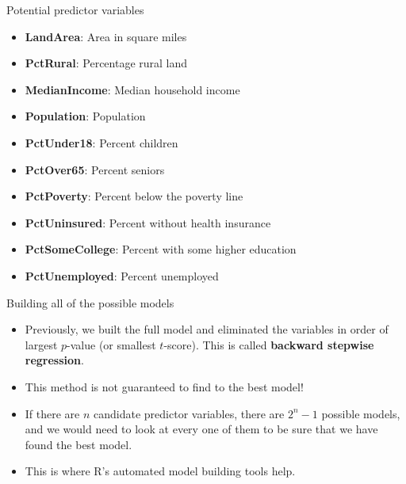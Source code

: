 \documentclass{beamer}\usepackage[]{graphicx}\usepackage[]{color}
\makeatletter
\newcommand{\hlnum}[1]{\textcolor[rgb]{0.824,0.412,0.118}{#1}}%
\newcommand{\hlcom}[1]{\textcolor[rgb]{0.824,0.706,0.549}{#1}}%
\newcommand{\hlopt}[1]{\textcolor[rgb]{1,0.894,0.769}{#1}}%
\newcommand{\hlstd}[1]{\textcolor[rgb]{1,0.894,0.769}{#1}}%
\newcommand{\hlkwd}[1]{\textcolor[rgb]{1,0.78,0.769}{#1}}%
\newenvironment{kframe}{%
 \def\at@end@of@kframe{}%
 \ifinner\ifhmode%
  \def\at@end@of@kframe{\end{minipage}}%
  \begin{minipage}{\columnwidth}%
 \fi\fi%
 \def\FrameCommand##1{\hskip\@totalleftmargin \hskip-\fboxsep
 \colorbox{shadecolor}{##1}\hskip-\fboxsep
     \hskip-\linewidth \hskip-\@totalleftmargin \hskip\columnwidth}%
 \MakeFramed {\advance\hsize-\width
   \@totalleftmargin\z@ \linewidth\hsize
   \@setminipage}}%
 {\par\unskip\endMakeFramed%
 \at@end@of@kframe}
\newenvironment{knitrout}{}{} %
\makeatother
\begin{document}
\begin{darkframes}

    \begin{frame}[fragile]{Potential predictor variables}
      \begin{itemize}
        \item \textbf{LandArea}:       Area in square miles
        \item \textbf{PctRural}:       Percentage rural land
        \item \textbf{MedianIncome}:   Median household income
        \item \textbf{Population}:     Population
        \item \textbf{PctUnder18}:     Percent children
        \item \textbf{PctOver65}:      Percent seniors
        \item \textbf{PctPoverty}:     Percent below the poverty line
        \item \textbf{PctUninsured}:   Percent without health insurance
        \item \textbf{PctSomeCollege}: Percent with some higher education
        \item \textbf{PctUnemployed}:  Percent unemployed
      \end{itemize}
    \end{frame}

    \begin{frame}{Building all of the possible models}
      \begin{itemize}[<+->]
        \item Previously, we built the full model and eliminated the variables in order of largest
        $p$-value (or smallest $t$-score). This is called \textbf{backward stepwise regression}.
        \item This method is not guaranteed to find to the best model!
        \item If there are $n$ candidate predictor variables, there are $2^n-1$ possible models, and we would need to look at every one of them to be sure that we have found the best model.
        \item This is where R's automated model building tools help.
      \end{itemize}
      \lc  %
    \end{frame}


\end{darkframes}
\end{document}
